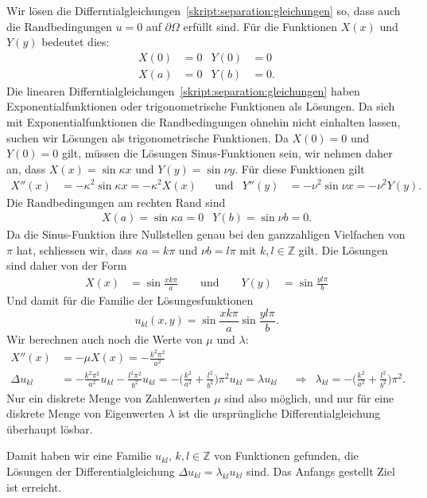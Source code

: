 Wir lösen die Differntialgleichungen~\eqref{skript:separation:gleichungen}
so, dass auch die Randbedingungen $u=0$ auf $\partial\Omega$ erfüllt sind.
Für die Funktionen $X(x)$ und $Y(y)$ bedeutet dies:
\[
\begin{aligned}
X(0)&=0 & Y(0) &= 0 \\
X(a)&=0 & Y(b) &= 0.
\end{aligned}
\]
Die linearen Differntialgleichungen~\eqref{skript:separation:gleichungen}
haben Exponentialfunktionen oder trigonometrische Funktionen als
Lösungen.
Da sich mit Exponentialfunktionen die Randbedingungen ohnehin nicht
einhalten lassen, suchen wir Lösungen als trigonometrische Funktionen.
Da $X(0)=0$ und $Y(0)=0$ gilt, müssen die Lösungen Sinus-Funktionen sein,
wir nehmen daher an, dass $X(x)=\sin \kappa x$ und $Y(y)=\sin \nu y$.
Für diese Funktionen gilt
\[
\begin{aligned}
X''(x) &= -\kappa^2\sin \kappa x = -\kappa^2 X(x)
&&\text{und}&
Y''(y) &= -\nu^2\sin \nu x = -\nu^2 Y(y).
\end{aligned}
\]
Die Randbedingungen am rechten Rand sind
\[
\begin{aligned}
X(a) = \sin \kappa a = 0
&
Y(b) = \sin \nu b = 0.
\end{aligned}
\]
Da die Sinus-Funktion ihre Nullstellen genau bei den ganzzahligen Vielfachen
von $\pi$ hat, schliessen wir, dass $\kappa a = k\pi$ und $\nu b = l\pi$
mit $k,l\in\mathbb Z$ gilt.
Die Lösungen sind daher von der Form
\[
\begin{aligned}
X(x) &= \sin \frac{xk\pi}{a}
\qquad \text{und} \qquad
Y(y) &= \sin\frac{yl\pi}{b}
\end{aligned}
\]
Und damit für die Familie der Lösungesfunktionen
\[
u_{kl}(x,y) = \sin \frac{xk\pi}{a} \sin\frac{yl\pi}{b}.
\]
Wir berechnen auch noch die Werte von $\mu$ und $\lambda$:
\begin{align*}
X''(x)
&=
-\mu X(x) = -\frac{k^2\pi^2}{a^2}
\\
\Delta u_{kl}
&=
-\frac{k^2\pi^2}{a^2} u_{kl}
-\frac{l^2\pi^2}{b^2} u_{kl}
=
-\biggl(\frac{k^2}{a^2}+\frac{l^2}{b^2}\biggr)\pi^2 u_{kl}
=
\lambda  u_{kl}
&&\Rightarrow&
\lambda_{kl} = - \biggl(\frac{k^2}{a^2}+\frac{l^2}{b^2}\biggr)\pi^2.
\end{align*}
Nur ein diskrete Menge von Zahlenwerten $\mu$ sind also möglich, und nur 
für eine diskrete Menge von Eigenwerten $\lambda$ ist die ursprüngliche 
Differentialgleichung überhaupt lösbar.

Damit haben wir eine Familie $u_{kl}$, $k,l\in\mathbb Z$ von Funktionen
gefunden, die Lösungen der Differentialgleichung
$\Delta u_{kl}=\lambda_{kl} u_{kl}$ sind.
Das Anfangs gestellt Ziel ist erreicht.


